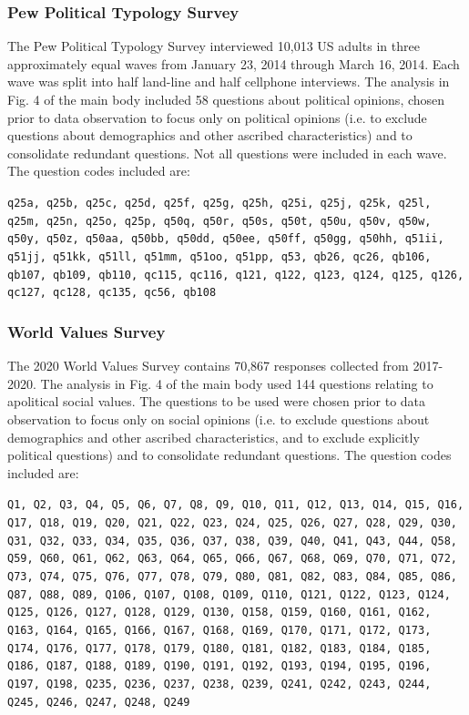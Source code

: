 \documentclass{article}
\begin{document}
\subsubsection{Pew Political Typology Survey}
The Pew Political Typology Survey interviewed 10,013 US adults in three approximately equal waves from January 23, 2014 through March 16, 2014. Each wave was split into half land-line and half cellphone interviews. The analysis in Fig. 4 of the main body included 58 questions about political opinions, chosen prior to data observation to focus only on political opinions (i.e. to exclude questions about demographics and other ascribed characteristics) and to consolidate redundant questions. Not all questions were included in each wave. The question codes included are:

\noindent
\texttt{q25a, q25b, q25c, q25d, q25f, q25g, q25h, q25i, q25j, q25k, q25l, q25m, q25n, q25o, q25p, q50q, q50r, q50s, q50t, q50u, q50v, q50w, q50y, q50z, q50aa, q50bb, q50dd, q50ee, q50ff, q50gg, q50hh, q51ii, q51jj, q51kk, q51ll, q51mm, q51oo, q51pp, q53, qb26, qc26, qb106, qb107, qb109, qb110, qc115, qc116, q121, q122, q123, q124, q125, q126, qc127, qc128, qc135, qc56, qb108}


\subsubsection{World Values Survey}
The 2020 World Values Survey \cite{wvs2020} contains 70,867 responses collected from 2017-2020. The analysis in Fig. 4 of the main body used 144 questions relating to apolitical social values. The questions to be used were chosen prior to data observation to focus only on social opinions (i.e. to exclude questions about demographics and other ascribed characteristics, and to exclude explicitly political questions) and to consolidate redundant questions. The question codes included are:

\noindent
\texttt{Q1, Q2, Q3, Q4, Q5, Q6, Q7, Q8, Q9, Q10, Q11, Q12, Q13, Q14, Q15, Q16, Q17, Q18, Q19, Q20, Q21, Q22, Q23, Q24, Q25, Q26, Q27, Q28, Q29, Q30, Q31, Q32, Q33, Q34, Q35, Q36, Q37, Q38, Q39, Q40, Q41, Q43, Q44, Q58, Q59, Q60, Q61, Q62, Q63, Q64, Q65, Q66, Q67, Q68, Q69, Q70, Q71, Q72, Q73, Q74, Q75, Q76, Q77, Q78, Q79, Q80, Q81, Q82, Q83, Q84, Q85, Q86, Q87, Q88, Q89, Q106, Q107, Q108, Q109, Q110, Q121, Q122, Q123, Q124, Q125, Q126, Q127, Q128, Q129, Q130, Q158, Q159, Q160, Q161, Q162, Q163, Q164, Q165, Q166, Q167, Q168, Q169, Q170, Q171, Q172, Q173, Q174, Q176, Q177, Q178, Q179, Q180, Q181, Q182, Q183, Q184, Q185, Q186, Q187, Q188, Q189, Q190, Q191, Q192, Q193, Q194, Q195, Q196, Q197, Q198, Q235, Q236, Q237, Q238, Q239, Q241, Q242, Q243, Q244, Q245, Q246, Q247, Q248, Q249}
\end{document}
